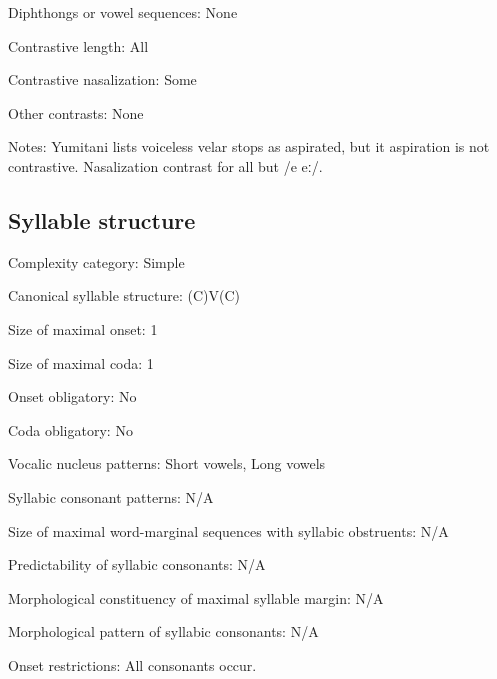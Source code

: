 {\begin{appendixdesc}
\item[Diphthongs or vowel sequences:] None

\item[Contrastive length:] All

\item[Contrastive nasalization:] Some

\item[Other contrasts:] None

\item[Notes:] Yumitani lists voiceless velar stops as aspirated, but it aspiration is not contrastive. Nasalization contrast for all but /e eː/.
\end{appendixdesc}
\subsection*{Syllable structure}
\begin{appendixdesc}

\item[Complexity category:] Simple

\item[Canonical syllable structure:] (C)V(C) \citep[21--22]{Yumitani1998}

\item[Size of maximal onset:] 1

\item[Size of maximal coda:] 1

\item[Onset obligatory:] No

\item[Coda obligatory:] No

\item[Vocalic nucleus patterns:] Short vowels, Long vowels

\item[Syllabic consonant patterns:] N/A

\item[Size of maximal word-marginal sequences with syllabic obstruents:] N/A

\item[Predictability of syllabic consonants:] N/A

\item[Morphological constituency of maximal syllable margin:] N/A

\item[Morphological pattern of syllabic consonants:] N/A

\item[Onset restrictions:] All consonants occur.


\end{appendixdesc}}
